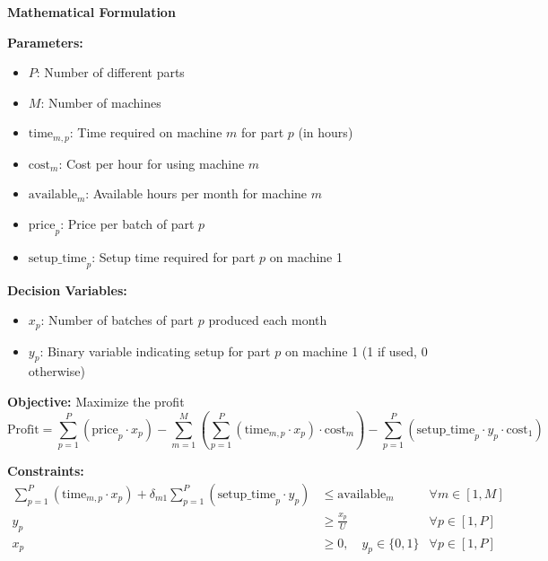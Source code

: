 \documentclass{article}
\begin{document}
\textbf{Mathematical Formulation}

\textbf{Parameters:}
\begin{itemize}
    \item $P$: Number of different parts
    \item $M$: Number of machines
    \item $\text{time}_{m,p}$: Time required on machine $m$ for part $p$ (in hours)
    \item $\text{cost}_{m}$: Cost per hour for using machine $m$
    \item $\text{available}_{m}$: Available hours per month for machine $m$
    \item $\text{price}_{p}$: Price per batch of part $p$
    \item $\text{setup\_time}_{p}$: Setup time required for part $p$ on machine 1
\end{itemize}

\textbf{Decision Variables:}
\begin{itemize}
    \item $x_p$: Number of batches of part $p$ produced each month
    \item $y_p$: Binary variable indicating setup for part $p$ on machine 1 (1 if used, 0 otherwise)
\end{itemize}

\textbf{Objective:} Maximize the profit
\[
\text{Profit} = \sum_{p=1}^{P} \left( \text{price}_p \cdot x_p \right) - \sum_{m=1}^{M} \left( \sum_{p=1}^{P} \left(\text{time}_{m,p} \cdot x_p\right) \cdot \text{cost}_m \right) - \sum_{p=1}^{P} \left( \text{setup\_time}_p \cdot y_p \cdot \text{cost}_1 \right)
\]

\textbf{Constraints:}
\begin{align*}
\sum_{p=1}^{P} \left(\text{time}_{m,p} \cdot x_p\right) + \delta_{m1} \sum_{p=1}^{P} \left(\text{setup\_time}_p \cdot y_p\right) &\leq \text{available}_m & \forall m \in [1, M]\\
y_p &\geq \frac{x_p}{U} & \forall p \in [1, P]\\
x_p &\geq 0, \quad y_p \in \{0, 1\} & \forall p \in [1, P]
\end{align*}
\end{document}
